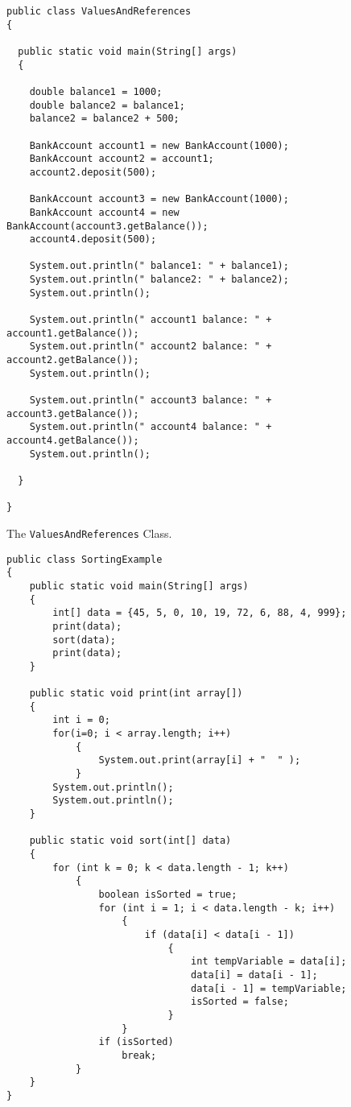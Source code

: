 \documentclass[12pt]{article}
\begin{document}
\begin{enumerate}
\begin{figure}[t]
\footnotesize{
\begin{verbatim}
public class ValuesAndReferences
{

  public static void main(String[] args)
  {

    double balance1 = 1000;
    double balance2 = balance1;
    balance2 = balance2 + 500;

    BankAccount account1 = new BankAccount(1000);
    BankAccount account2 = account1;
    account2.deposit(500);

    BankAccount account3 = new BankAccount(1000);
    BankAccount account4 = new BankAccount(account3.getBalance());
    account4.deposit(500);

    System.out.println(" balance1: " + balance1);
    System.out.println(" balance2: " + balance2);
    System.out.println();

    System.out.println(" account1 balance: " + account1.getBalance());
    System.out.println(" account2 balance: " + account2.getBalance());
    System.out.println();

    System.out.println(" account3 balance: " + account3.getBalance());
    System.out.println(" account4 balance: " + account4.getBalance());
    System.out.println();

  }

}
\end{verbatim}
}

\caption{The {\tt ValuesAndReferences} Class.}
\label{ValuesAndReferences}
\end{figure}

\begin{figure}[t]

\footnotesize{
\begin{verbatim}
public class SortingExample
{
    public static void main(String[] args)
    {
        int[] data = {45, 5, 0, 10, 19, 72, 6, 88, 4, 999};
        print(data);
        sort(data);
        print(data);
    }

    public static void print(int array[])
    {
        int i = 0;
        for(i=0; i < array.length; i++)
            {
                System.out.print(array[i] + "  " );
            }
        System.out.println();
        System.out.println();
    }

    public static void sort(int[] data)
    {
        for (int k = 0; k < data.length - 1; k++)
            {
                boolean isSorted = true;
                for (int i = 1; i < data.length - k; i++)
                    {
                        if (data[i] < data[i - 1])
                            {
                                int tempVariable = data[i];
                                data[i] = data[i - 1];
                                data[i - 1] = tempVariable;
                                isSorted = false;
                            }
                    }
                if (isSorted)
                    break;
            }
    }
}
\end{verbatim}
}


\end{figure}
\end{enumerate}
\end{document}

